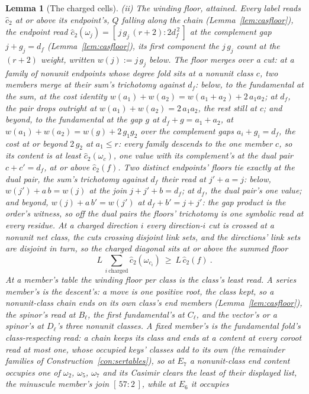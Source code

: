 \documentclass[11pt]{article}
\newtheorem{lemma}{Lemma}
\theoremstyle{definition}
\begin{document}
\begin{lemma}[The charged cells]
\emph{(ii) The winding floor, attained.} Every label reads
$\hat c_2$ at or above its endpoint's, $Q$ falling along the chain
(Lemma~\ref{lem:casfloor}), the endpoint read
$\hat c_2(\omega_j)=[\,j\,g_j\,(r+2):2d_f^{\,2}\,]$ at the
complement gap $j+g_j=d_f$
(Lemma~\ref{lem:casfloor}), its first component the $j\,g_j$ count
at the $(r+2)$ weight, written $w(j):=j\,g_j$ below. The floor
merges over a
cut: at a family of
nonunit endpoints whose degree fold sits at a nonunit class $c$,
two members merge at their sum's trichotomy against $d_f$: below,
to the fundamental at the sum, at the cost identity
$w(a_1)+w(a_2)=w(a_1{+}a_2)+2\,a_1a_2$; at $d_f$, the pair drops
outright at $w(a_1)+w(a_2)=2\,a_1a_2$, the rest still at $c$; and
beyond, to the fundamental at the gap $g$ at $d_f+g=a_1+a_2$, at
$w(a_1)+w(a_2)=w(g)+2\,g_1g_2$ over the complement gaps
$a_i+g_i=d_f$, the cost at or beyond $2\,g_2$ at $a_1\le r$: every
family
descends to the one member $c$, so its content is at least
$\hat c_2(\omega_c)$, one value with its complement's at the dual
pair $c+c'=d_f$, at or above $\hat c_2(f)$. Two distinct
endpoints' floors tie exactly at the dual pair, the sum's
trichotomy against $d_f$ their read at $j'+a=j$: below,
$w(j')+a\,b=w(j)$ at the join $j+j'+b=d_f$; at $d_f$, the dual
pair's one value; and beyond, $w(j)+a\,b'=w(j')$ at $d_f+b'=j+j'$:
the gap product is the order's witness, so off the dual pairs the
floors' trichotomy is one symbolic read at every residue. At a charged
direction $i$ every direction-$i$ cut is crossed at a nonunit net
class, the cuts crossing disjoint link sets, and the directions'
link sets are disjoint in turn, so the charged diagonal sits at or
above the summed floor
\[
L\,\sum_{i\ \mathrm{charged}}\hat c_2(\omega_{c_i})\ \ge\ L\,\hat c_2(f)\ .
\]
At a member's table the winding floor per class is the class's
least read. A series member's is the descent's: a move is one
positive root, the class kept, so a nonunit-class chain ends on
its own class's end members (Lemma~\ref{lem:casfloor}), the
spinor's read at $B_\ell$, the first fundamental's at $C_\ell$,
and the vector's or a spinor's at $D_\ell$'s three nonunit
classes. A fixed member's is the fundamental fold's
class-respecting read: a chain keeps its class and ends at a
content at every coroot read at most one, whose occupied keys'
classes add to its own (the remainder families of
Construction~\ref{con:sertables}), so at $E_7$ a nonunit-class
end content occupies one of $\omega_2$, $\omega_5$, $\omega_7$
and its Casimir clears the least of their displayed list, the
minuscule member's join $[\,57:2\,]$, while at $E_6$ it occupies

\end{lemma}
\end{document}
